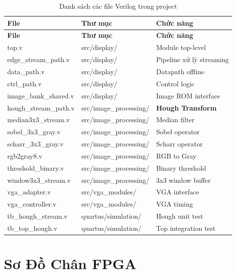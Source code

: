 \documentclass[12pt,a4paper]{report}
\begin{document}
\begin{longtable}{|l|l|p{6cm}|}
\caption{Danh sách các file Verilog trong project} \\
\hline
\textbf{File} & \textbf{Thư mục} & \textbf{Chức năng} \\
\hline
\endfirsthead
\hline
\textbf{File} & \textbf{Thư mục} & \textbf{Chức năng} \\
\hline
\endhead
\hline
\endfoot

top.v & src/display/ & Module top-level \\
edge\_stream\_path.v & src/display/ & Pipeline xử lý streaming \\
data\_path.v & src/display/ & Datapath offline \\
ctrl\_path.v & src/display/ & Control logic \\
image\_bank\_shared.v & src/display/ & Image ROM interface \\
\hline
hough\_stream\_path.v & src/image\_processing/ & \textbf{Hough Transform} \\
median3x3\_stream.v & src/image\_processing/ & Median filter \\
sobel\_3x3\_gray.v & src/image\_processing/ & Sobel operator \\
scharr\_3x3\_gray.v & src/image\_processing/ & Scharr operator \\
rgb2gray8.v & src/image\_processing/ & RGB to Gray \\
threshold\_binary.v & src/image\_processing/ & Binary threshold \\
window3x3\_stream.v & src/image\_processing/ & 3x3 window buffer \\
\hline
vga\_adapter.v & src/vga\_modules/ & VGA interface \\
vga\_controller.v & src/vga\_modules/ & VGA timing \\
\hline
tb\_hough\_stream.v & quartus/simulation/ & Hough unit test \\
tb\_top\_hough.v & quartus/simulation/ & Top integration test \\
\hline
\end{longtable}

\chapter{Sơ Đồ Chân FPGA}
\end{document}
